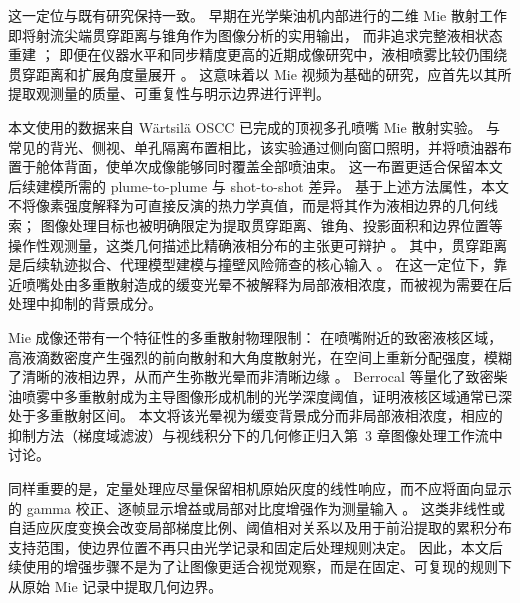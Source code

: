 这一定位与既有研究保持一致。
早期在光学柴油机内部进行的二维 Mie 散射工作即将射流尖端贯穿距离与锥角作为图像分析的实用输出，
而非追求完整液相状态重建 \cite{MuenchLeipertz1992}；
即便在仪器水平和同步精度更高的近期成像研究中，液相喷雾比较仍围绕贯穿距离和扩展角度量展开 \cite{JungManinSkeenPickett2015}。
这意味着以 Mie 视频为基础的研究，应首先以其所提取观测量的质量、可重复性与明示边界进行评判。

本文使用的数据来自 Wärtsilä OSCC 已完成的顶视多孔喷嘴 Mie 散射实验。
与常见的背光、侧视、单孔隔离布置相比，该实验通过侧向窗口照明，并将喷油器布置于舱体背面，使单次成像能够同时覆盖全部喷油束。
这一布置更适合保留本文后续建模所需的 plume-to-plume 与 shot-to-shot 差异。
基于上述方法属性，本文不将像素强度解释为可直接反演的热力学真值，而是将其作为液相边界的几何线索；
图像处理目标也被明确限定为提取贯穿距离、锥角、投影面积和边界位置等操作性观测量，这类几何描述比精确液相分布的主张更可辩护 \cite{Linne2013SprayImaging,LefebvreMcDonell2017}。
其中，贯穿距离是后续轨迹拟合、代理模型建模与撞壁风险筛查的核心输入 \cite{Linne2013SprayImaging,LefebvreMcDonell2017,Dent1971Penetration,HiroyasuArai1990,NaberSiebers1996}。
在这一定位下，靠近喷嘴处由多重散射造成的缓变光晕不被解释为局部液相浓度，而被视为需要在后处理中抑制的背景成分。

Mie 成像还带有一个特征性的多重散射物理限制：
在喷嘴附近的致密液核区域，高液滴数密度产生强烈的前向散射和大角度散射光，在空间上重新分配强度，模糊了清晰的液相边界，从而产生弥散光晕而非清晰边缘 \cite{BohrenHuffman2004,Linne2013SprayImaging,Berrocal2007MultipleScattering}。
Berrocal 等量化了致密柴油喷雾中多重散射成为主导图像形成机制的光学深度阈值，证明液核区域通常已深处于多重散射区间。
本文将该光晕视为缓变背景成分而非局部液相浓度，相应的抑制方法（梯度域滤波）与视线积分下的几何修正归入第~3 章图像处理工作流中讨论。

同样重要的是，定量处理应尽量保留相机原始灰度的线性响应，而不应将面向显示的 gamma 校正、逐帧显示增益或局部对比度增强作为测量输入 \cite{Cromey2010TwistedPixels}。
这类非线性或自适应灰度变换会改变局部梯度比例、阈值相对关系以及用于前沿提取的累积分布支持范围，使边界位置不再只由光学记录和固定后处理规则决定。
因此，本文后续使用的增强步骤不是为了让图像更适合视觉观察，而是在固定、可复现的规则下从原始 Mie 记录中提取几何边界。

